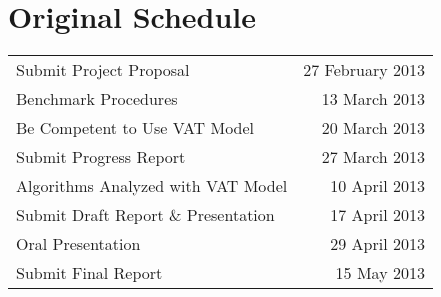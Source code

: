 \section{Original Schedule}
  \begin{tabular}{lr}
    Submit Project Proposal             & 27 February 2013\\
    Benchmark Procedures                & 13 March 2013   \\
    Be Competent to Use VAT Model       & 20 March 2013   \\
    Submit Progress Report              & 27 March 2013   \\
    Algorithms Analyzed with VAT Model  & 10 April 2013 \\
    Submit Draft Report \& Presentation & 17 April 2013   \\
    Oral Presentation                   & 29 April 2013   \\
    Submit Final Report                 & 15 May 2013     \\
  \end{tabular}
  
